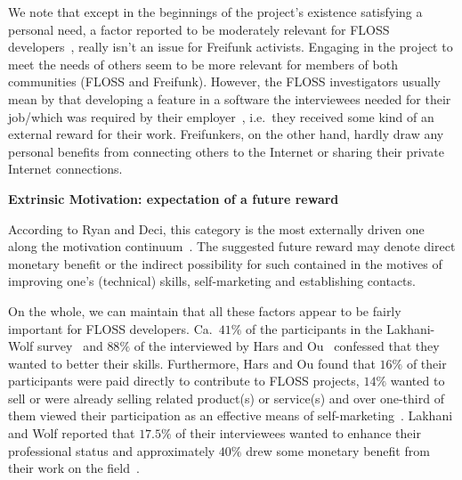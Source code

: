 We note that except in the beginnings of the project's existence satisfying a personal need,
a factor reported to be moderately relevant for FLOSS developers~\cite{LakWo2005},
really isn't an issue for Freifunk activists.
Engaging in the project to meet the needs of others seem to be more relevant for members of both communities (FLOSS and Freifunk).
However, the FLOSS investigators usually mean by that developing a feature in a software the interviewees needed for their job/which was required by their employer~\cite{LakWo2005}, i.e.\ they received some kind of an external reward for their work.
Freifunkers, on the other hand, hardly draw any personal benefits from connecting others to the Internet or sharing their private Internet connections.




\textbf{Extrinsic Motivation: expectation of a future reward}

According to Ryan and Deci, this category is the most externally driven one along the motivation continuum~\cite{RyDe2000}.
The suggested future reward may denote direct monetary benefit or the indirect possibility for such contained in the motives of improving one's (technical) skills, self-marketing and establishing contacts.

On the whole, we can maintain that all these factors appear to be fairly important for FLOSS developers.
Ca.\ $41\%$ of the participants in the Lakhani-Wolf survey~\cite{LakWo2005} and $88\%$ of the interviewed by Hars and Ou~\cite{HarOu2002} confessed that they wanted to better their skills.
Furthermore, Hars and Ou found that $16\%$ of their participants were paid directly to contribute to FLOSS projects, $14\%$ wanted to sell or were already selling related product(s) or service(s) and over one-third of them viewed their participation as an effective means of self-marketing~\cite{HarOu2002}.
Lakhani and Wolf reported that $17.5\%$ of their interviewees wanted to enhance their professional status and approximately $40\%$ drew some monetary benefit from their work on the field~\cite{LakWo2005}.

